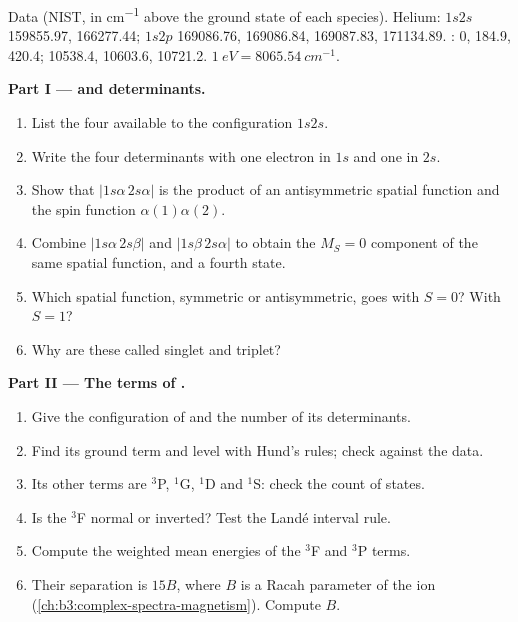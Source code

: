 \begin{problem}
\label{pb:b3:many-electron-atoms:1}
Data (NIST, in \unit{cm^{-1}} above the ground state of each species). Helium:
$1s2s$  159855.97,  166277.44; $1s2p$
 169086.76, 169086.84, 169087.83, 
171134.89. :  0, 184.9, 420.4; 
10538.4, 10603.6, 10721.2. $\qty{1}{eV} = \qty{8065.54}{cm^{-1}}$.

\medskip\noindent\textbf{Part I ---  and determinants.}
\begin{enumerate}
  \item List the four  available to the configuration $1s2s$.
  \item Write the four determinants with one electron in $1s$ and one in
        $2s$.
  \item Show that $|1s\alpha\,2s\alpha|$ is the product of an antisymmetric
        spatial function and the spin function $\alpha(1)\alpha(2)$.
  \item Combine $|1s\alpha\,2s\beta|$ and $|1s\beta\,2s\alpha|$ to obtain the
        $M_S = 0$ component of the same spatial function, and a fourth state.
  \item Which spatial function, symmetric or antisymmetric, goes with
        $S = 0$? With $S = 1$?
  \item Why are these called singlet and triplet?
\end{enumerate}

\medskip\noindent\textbf{Part II --- The terms of .}
\begin{enumerate}[resume]
  \item Give the configuration of  and the number of its
        determinants.
  \item Find its ground term and level with Hund's rules; check against the
        data.
  \item Its other terms are ${}^3$P, ${}^1$G, ${}^1$D and ${}^1$S: check the count of
        states.
  \item Is the ${}^3$F  normal or inverted? Test the Landé
        interval rule.
  \item Compute the weighted mean energies of the ${}^3$F and ${}^3$P terms.
  \item Their separation is $15B$, where $B$ is a Racah parameter of the
        ion (\cref{ch:b3:complex-spectra-magnetism}). Compute $B$.
\end{enumerate}


\end{problem}
